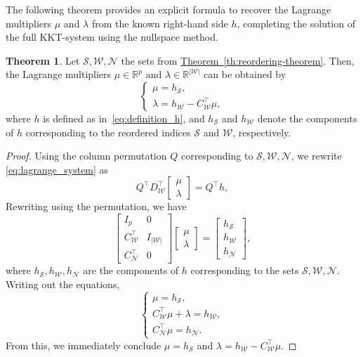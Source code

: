 \documentclass{book}
\theoremstyle{definition}
\newtheorem{theorem}{Theorem}[section]
\newcommand{\thref}[1]{\hyperref[#1]{Theorem~\ref*{#1}}}
\numberwithin{algorithm_}{chapter}
\begin{document}
{The following theorem provides an explicit formula to recover the Lagrange multipliers \(\mu\) and \(\lambda\) from the known right-hand side \(h\), completing the solution of the full KKT-system using the nullspace method.


\begin{theorem} \label{th:lagrange-multipliers}
Let $\mathcal{S}, \mathcal{W}, \mathcal{N}$ the sets from \thref{th:reordering-theorem}. Then, the Lagrange multipliers \(\mu \in \mathbb{R}^p\) and \(\lambda \in \mathbb{R}^{|\mathcal{W}|}\) can be obtained by
\begin{equation}
\begin{cases}
\mu = h_\mathcal{S}, \\
\lambda = h_\mathcal{W} - C_\mathcal{W}^\top \mu,
\end{cases}
\end{equation}
where $h$ is defined as in~\eqref{eq:definition_h}, and \(h_\mathcal{S}\) and \(h_\mathcal{W}\) denote the components of \(h\) corresponding to the reordered indices \(\mathcal{S}\) and \(\mathcal{W}\), respectively.

\begin{proof}
Using the column permutation \(Q\) corresponding to $\mathcal{S}, \mathcal{W}, \mathcal{N}$, we rewrite \eqref{eq:lagrange_system} as
\begin{equation}
Q^\top D_\mathcal{W}^\top 
\begin{bmatrix} \mu \\ \lambda \end{bmatrix} 
= Q^\top h,
\end{equation}
Rewriting using the permutation, we have
\begin{equation}
\begin{bmatrix} I_p & 0 \\ C_\mathcal{W}^\top & I_{|\mathcal{W}|} \\ C_\mathcal{N}^\top & 0 \end{bmatrix} 
\begin{bmatrix} \mu \\ \lambda \end{bmatrix} 
= 
\begin{bmatrix} h_\mathcal{S} \\ h_\mathcal{W} \\ h_\mathcal{N} \end{bmatrix},
\end{equation}
where $h_\mathcal{S}, h_\mathcal{W}, h_\mathcal{N}$ are the components of $h$ corresponding to the sets $\mathcal{S}, \mathcal{W}, \mathcal{N}$. Writing out the equations,
\begin{equation}
\begin{cases}
\mu = h_\mathcal{S}, \\
C_\mathcal{W}^\top \mu + \lambda = h_\mathcal{W}, \\
C_\mathcal{N}^\top \mu = h_\mathcal{N}.
\end{cases}
\end{equation}
From this, we immediately conclude $\mu = h_\mathcal{S}$ and $\lambda = h_\mathcal{W} - C_\mathcal{W}^\top \mu$.


\end{proof}
\end{theorem}}
\end{document}
